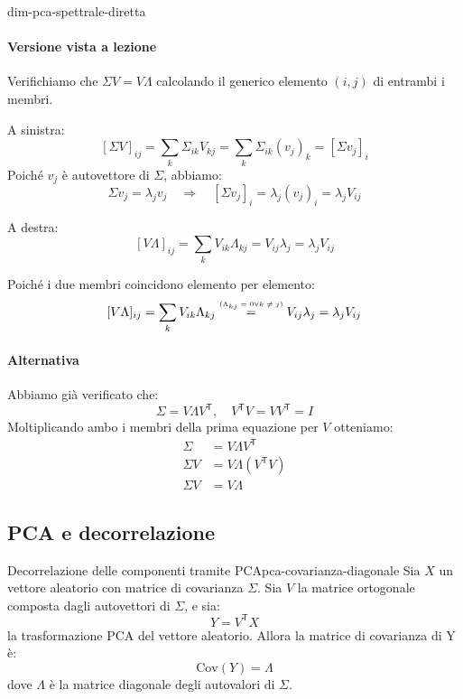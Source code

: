 \begin{dimostrazione}{}{dim-pca-spettrale-diretta}
    \paragraph{Versione vista a lezione} Verifichiamo che \( \Sigma V = V
    \Lambda \) calcolando il generico elemento \( (i, j) \) di entrambi i
    membri.

A sinistra:
\[
[\Sigma V]_{ij} = \sum_k \Sigma_{ik} V_{kj}
= \sum_k \Sigma_{ik} (v_j)_k = [\Sigma v_j]_i
\]
Poiché \( v_j \) è autovettore di \( \Sigma \), abbiamo:
\[
\Sigma v_j = \lambda_j v_j \quad \Rightarrow \quad [\Sigma v_j]_i = \lambda_j
(v_j)_i = \lambda_j V_{ij}
\]

A destra:
\[
[V \Lambda]_{ij} = \sum_k V_{ik} \Lambda_{kj} = V_{ij} \lambda_j = \lambda_j
V_{ij}
\]

Poiché i due membri coincidono elemento per elemento:
\[
    [V \Lambda]_{ij} = \sum_k V_{ik} \Lambda_{kj} \stackrel{\text{\tiny
    (\(\Lambda_{kj} = 0 \forall k \neq j\))}}{=} V_{ij} \lambda_j = \lambda_j
    V_{ij}
\]

\paragraph{Alternativa}

Abbiamo già verificato che:
\[
\Sigma = V \Lambda V^\mathsf{T} ,\quad V^\mathsf{T}V = VV^\mathsf{T} = I
\]
Moltiplicando ambo i membri della prima equazione per $V$ otteniamo:
\begin{align*}
    \Sigma &= V \Lambda V^\mathsf{T} \\
    \Sigma V &= V \Lambda (V^\mathsf{T} V) \\
    \Sigma V &= V \Lambda
\end{align*}
\end{dimostrazione}

\subsection{PCA e decorrelazione}

\begin{proposizione}{Decorrelazione delle componenti tramite
PCA}{pca-covarianza-diagonale}
Sia \( X \) un vettore aleatorio con matrice di covarianza \(\Sigma\). Sia \( V
\) la matrice ortogonale composta dagli autovettori di \( \Sigma \), e sia:
\[
Y = V^\mathsf{T} X
\]
la trasformazione PCA del vettore aleatorio. Allora la matrice di covarianza di
Y è:
\[
\mathrm{Cov}(Y) = \Lambda
\]
dove \( \Lambda \) è la matrice diagonale degli autovalori di \( \Sigma \).
\end{proposizione}

